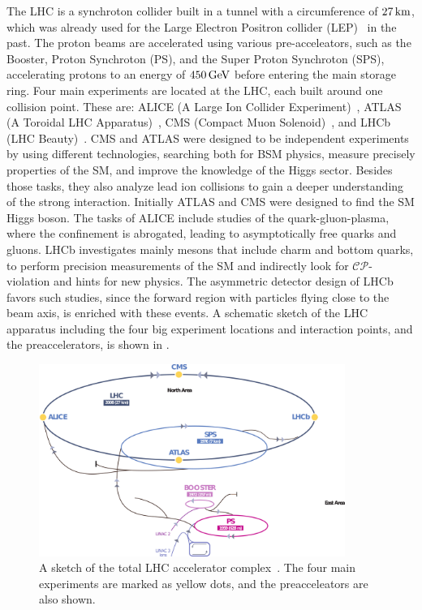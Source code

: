 The LHC is a synchroton collider built in a tunnel with a circumference of $27\,\text{km}$, which was already used for the Large Electron Positron collider (LEP)~\cite{LEPCollider} in the past. The proton beams are accelerated using various pre-acceleators, such as the Booster, Proton Synchroton (PS), and the Super Proton Synchroton (SPS), accelerating protons to an energy of $450\,\text{Ge\hspace{-.08em}V}$ before entering the main storage ring. Four main experiments are located at the LHC, each built around one collision point. These are: ALICE (A Large Ion Collider Experiment)~\cite{ALICE}, ATLAS (A Toroidal LHC Apparatus)~\cite{ATLAS}, CMS (Compact Muon Solenoid)~\cite{CMS}, and LHCb (LHC Beauty)~\cite{LHCb}. CMS and ATLAS were designed to be independent experiments by using different technologies, searching both for BSM physics, measure precisely properties of the SM, and improve the knowledge of the Higgs sector. Besides those tasks, they also analyze lead ion collisions to gain a deeper understanding of the strong interaction. Initially ATLAS and CMS were designed to find the SM Higgs boson. The tasks of ALICE include studies of the quark-gluon-plasma, where the confinement is abrogated, leading to asymptotically free quarks and gluons. LHCb investigates mainly mesons that include charm and bottom quarks, to perform precision measurements of the SM and indirectly look for $\mathcal{CP}$-violation and hints for new physics. The asymmetric detector design of LHCb favors such studies, since the forward region with particles flying close to the beam axis, is enriched with these events. A schematic sketch of the LHC apparatus including the four big experiment locations and interaction points, and the preaccelerators, is shown in .\\
\begin{figure}[tbp]
 \centering
 \includegraphics[width=0.89\textwidth]{figures/general/LHC}
 \caption{A sketch of the total LHC accelerator complex~\cite{LHCPicture}. The four main experiments are marked as yellow dots, and the preacceleators are also shown.}
 \label{fig:LHC}
\end{figure}
